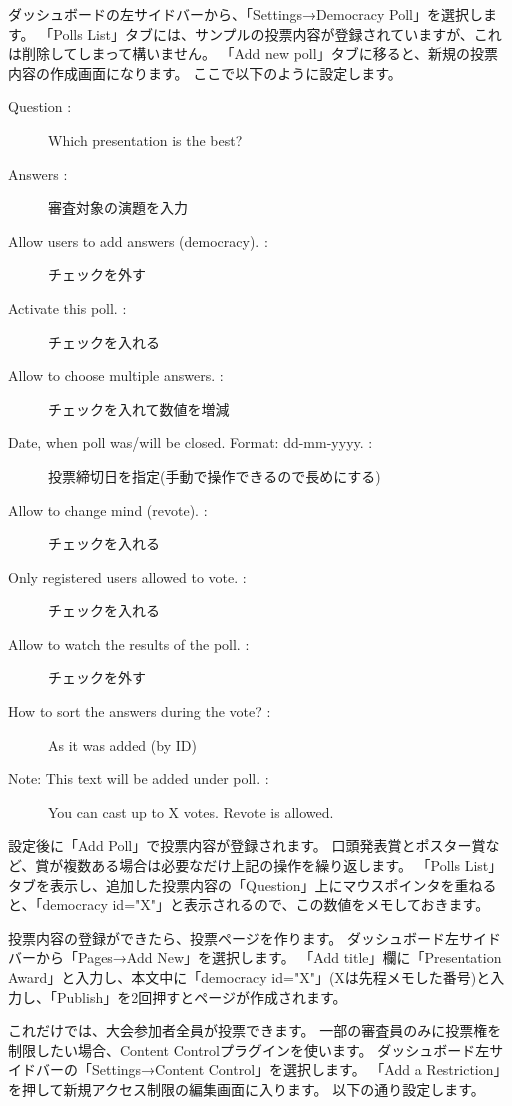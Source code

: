 \documentclass[titlepage,10pt,a4paper,uplatex]{jsbook}
\begin{document}
ダッシュボードの左サイドバーから、「Settings→Democracy Poll」を選択します。
「Polls List」タブには、サンプルの投票内容が登録されていますが、これは削除してしまって構いません。
「Add new poll」タブに移ると、新規の投票内容の作成画面になります。
ここで以下のように設定します。

\begin{description}
\item[Question : ] Which presentation is the best?
\item[Answers : ] 審査対象の演題を入力
\item[Allow users to add answers (democracy). : ] チェックを外す
\item[Activate this poll. : ] チェックを入れる
\item[Allow to choose multiple answers. : ] チェックを入れて数値を増減
\item[Date, when poll was/will be closed. Format: dd-mm-yyyy. : ] 投票締切日を指定(手動で操作できるので長めにする)
\item[Allow to change mind (revote). : ] チェックを入れる
\item[Only registered users allowed to vote. : ] チェックを入れる
\item[Allow to watch the results of the poll. : ] チェックを外す
\item[How to sort the answers during the vote? : ] As it was added (by ID)
\item[Note: This text will be added under poll. : ] You can cast up to X votes. Revote is allowed.
\end{description}

設定後に「Add Poll」で投票内容が登録されます。
口頭発表賞とポスター賞など、賞が複数ある場合は必要なだけ上記の操作を繰り返します。
「Polls List」タブを表示し、追加した投票内容の「Question」上にマウスポインタを重ねると、「{\lbrack}democracy id="X"{\rbrack}」と表示されるので、この数値をメモしておきます。

投票内容の登録ができたら、投票ページを作ります。
ダッシュボード左サイドバーから「Pages→Add New」を選択します。
「Add title」欄に「Presentation Award」と入力し、本文中に「{\lbrack}democracy id="X"{\rbrack}」(Xは先程メモした番号)と入力し、「Publish」を2回押すとページが作成されます。

これだけでは、大会参加者全員が投票できます。
一部の審査員のみに投票権を制限したい場合、Content Controlプラグインを使います。
ダッシュボード左サイドバーの「Settings→Content Control」を選択します。
「Add a Restriction」を押して新規アクセス制限の編集画面に入ります。
以下の通り設定します。
\end{document}
